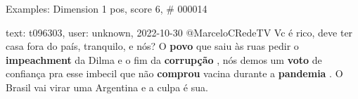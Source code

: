 \begin{frame}{Examples: Dimension 1 pos, score 6, \# 000014}
\footnotesize
\begin{exampleblock}{text: t096303, user: unknown, 2022-10-30}
@MarceloCRedeTV Vc é rico, deve ter casa fora do país, tranquilo, e nós? O 
\textbf{povo} que saiu às ruas pedir o \textbf{impeachment} da Dilma e o fim da 
\textbf{corrupção} , nós demos um \textbf{voto} de confiança pra esse imbecil 
que não \textbf{comprou} vacina durante a \textbf{pandemia} . O Brasil vai 
virar uma Argentina e a culpa é sua. 
\end{exampleblock}
\end{frame}
